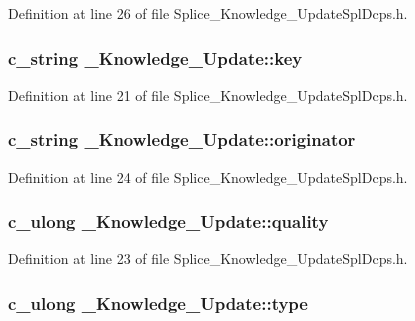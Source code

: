 Definition at line 26 of file Splice\_\-Knowledge\_\-UpdateSplDcps.h.

\hypertarget{struct__Knowledge__Update_ae6bf286683e3ce89204b2460bf77976d}{
\subsubsection[{key}]{\setlength{\rightskip}{0pt plus 5cm}c\_\-string {\bf \_\-Knowledge\_\-Update::key}}}
\label{dd/dc6/struct__Knowledge__Update_ae6bf286683e3ce89204b2460bf77976d}


Definition at line 21 of file Splice\_\-Knowledge\_\-UpdateSplDcps.h.

\hypertarget{struct__Knowledge__Update_ac118c902b23ec349bb3cb9c08ac47f69}{
\subsubsection[{originator}]{\setlength{\rightskip}{0pt plus 5cm}c\_\-string {\bf \_\-Knowledge\_\-Update::originator}}}
\label{dd/dc6/struct__Knowledge__Update_ac118c902b23ec349bb3cb9c08ac47f69}


Definition at line 24 of file Splice\_\-Knowledge\_\-UpdateSplDcps.h.

\hypertarget{struct__Knowledge__Update_a80ece4580d1d41f7128cd6f8831e8339}{
\subsubsection[{quality}]{\setlength{\rightskip}{0pt plus 5cm}c\_\-ulong {\bf \_\-Knowledge\_\-Update::quality}}}
\label{dd/dc6/struct__Knowledge__Update_a80ece4580d1d41f7128cd6f8831e8339}


Definition at line 23 of file Splice\_\-Knowledge\_\-UpdateSplDcps.h.

\hypertarget{struct__Knowledge__Update_a2215adbfc2cec6b057f191ea4b2a961a}{
\subsubsection[{type}]{\setlength{\rightskip}{0pt plus 5cm}c\_\-ulong {\bf \_\-Knowledge\_\-Update::type}}}
\label{dd/dc6/struct__Knowledge__Update_a2215adbfc2cec6b057f191ea4b2a961a}


